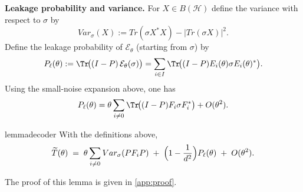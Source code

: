 \documentclass[12pt]{article}
\theoremstyle{definition} %
\theoremstyle{plain} %
\theoremstyle{remark} %
\theoremstyle{underline}
\begin{document}
\medskip

\noindent
\textbf{Leakage probability and variance.}
For $X\in B(\mathcal H)$ define the variance with respect to $\sigma$ by
\[
    Var_\sigma(X):=Tr(\sigma X^*X)-|Tr(\sigma X)|^2.
\]
Define the leakage probability of $\mathcal E_\theta$ (starting from $\sigma$) by
\begin{equation}\label{eq:leak-prob}
    P_\ell(\theta):=\Tr\!\bigl((I-P)\,\mathcal E_\theta(\sigma)\bigr)
    =\sum_{i\in I}\Tr\!\bigl((I-P)E_i(\theta)\sigma E_i(\theta)^*\bigr).
\end{equation}
Using the small-noise expansion above, one has
\begin{equation}\label{eq:leak-prob-expansion}
    P_\ell(\theta)=\theta\sum_{i\neq 0}\Tr\!\bigl((I-P)F_i\sigma F_i^*\bigr)+O(\theta^2).
\end{equation}

\begin{restatable}{lemma}{decoder}
\label{lem:poor-decoder-expansion}
With the definitions above,
    \begin{equation}\label{eq:Ttilde-expansion}
        \widetilde T(\theta)
        \;=\;
        \theta\sum_{i\neq 0}Var_\sigma(PF_iP)
        \;+\;
        \Bigl(1-\frac{1}{d^2}\Bigr)P_\ell(\theta)
        \;+\;
        O(\theta^2).
    \end{equation}
\end{restatable}

The proof of this lemma is given in \ref{app:proof}.



\end{document}
